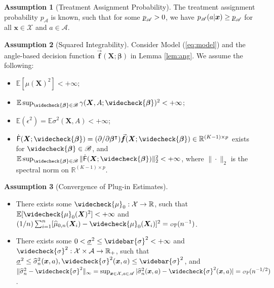 \documentclass[11pt]{article}
\theoremstyle{definition}
\newtheorem{asm}{Assumption}
\theoremstyle{remark}
\newcommand{\bbf}{\bm{f}}
\newcommand{\bx}{\bm{x}}
\newcommand{\bX}{\bm{X}}
\newcommand{\bbeta}{\bm{\beta}}
\newcommand{\bbE}{\mathbb{E}}
\newcommand{\bbP}{\mathbb{P}}
\newcommand{\bbR}{\mathbb{R}}
\newcommand{\cA}{\mathcal{A}}
\newcommand{\cX}{\mathcal{X}}
\newcommand{\sA}{\mathscr{A}}
\newcommand{\sB}{\mathscr{B}}
\newcommand{\sfF}{\mathsf{F}}
\newcommand\smallcO{
	\mathchoice
	{{\scriptscriptstyle\mathcal{O}}}%
	{{\scriptscriptstyle\mathcal{O}}}%
	{{\scriptscriptstyle\mathcal{O}}}%
	{\scalebox{.5}{$\scriptscriptstyle\mathcal{O}$}}%
}
\def\ubar#1{\underbar{$ #1 $}}
\begin{document}
\begin{asm}[Treatment Assignment Probability]\label{asm:prop}
	The treatment assignment probability $ p_{\sA} $ is known, such that for some $ \ubar{p}_{\sA} > 0 $, we have $ p_{\sA}(a|\bx) \ge \ubar{p}_{\sA} $ for all $ \bx \in \cX $ and $ a \in \cA $.
\end{asm}

\begin{asm}[Squared Integrability]\label{asm:int}
	Consider Model (\ref{eq:model}) and the angle-based decision function $ \vec{\bbf}(\bX;\bbeta) $ in Lemma \ref{lem:ang}. We assume the following:
	
	\begin{itemize}
		\item $ \bbE[\mu(\bX)^{2}] < +\infty $; 
		
		\item $ \bbE\sup_{\widecheck{\bbeta} \in \sB}\gamma(\bX,A;\widecheck{\bbeta})^{2} < +\infty $; 
		
		\item $ \bbE(\epsilon^{2}) = \bbE\sigma^{2}(\bX,A) < +\infty $; 
		
		\item $ \dot{\sfF}(\bX;\widecheck{\bbeta}) = (\partial/\partial\bbeta^{\intercal})\vec{\bbf}(\bX;\widecheck{\bbeta}) \in \bbR^{(K-1)\times p} $ exists for $ \widecheck{\bbeta} \in \sB $, and $ 
		\bbE\sup_{\widecheck{\bbeta} \in \sB}\| \dot{\sfF}(\bX;\widecheck{\bbeta}) \|_{2}^{2} < +\infty $, where $ \| \cdot \|_{2} $ is the spectral norm on $ \bbR^{(K-1) \times p} $.
	\end{itemize}
\end{asm}

\begin{asm}[Convergence of Plug-in Estimates]\label{asm:plug-in}
	\item 
	\begin{itemize}
		\item There exists some $ \widecheck{\mu}_{0}: \cX \to \bbR $, such that $ \bbE[\widecheck{\mu}_{0}(\bX)^{2}]  < +\infty $ and $ (1/n)\sum_{i=1}^{n}[\widehat{\mu}_{0,n}(\bX_{i}) - \widecheck{\mu}_{0}(\bX_{i})]^{2} = \smallcO_{\bbP}(n^{-1}) $.
		
		\item There exists some $ 0 < \ubar{\sigma}^{2}\le \widebar{\sigma}^{2} < +\infty $ and $ \widecheck{\sigma}^{2}:\cX\times\cA \to \bbR_{+} $, such that $ \ubar{\sigma}^{2} \le \widehat{\sigma}_{n}^{2}(\bx,a),\widecheck{\sigma}^{2}(\bx,a) \le \widebar{\sigma}^{2} $, and $ \| \widehat{\sigma}_{n}^{2} - \widecheck{\sigma}^{2} \|_{\infty} = \sup_{\bx \in \cX,a \in \sA}|\widehat{\sigma}_{n}^{2}(\bx,a) - \widecheck{\sigma}^{2}(\bx,a)| = \smallcO_{\bbP}(n^{-1/2}) $.
	\end{itemize}
\end{asm}
\end{document}
